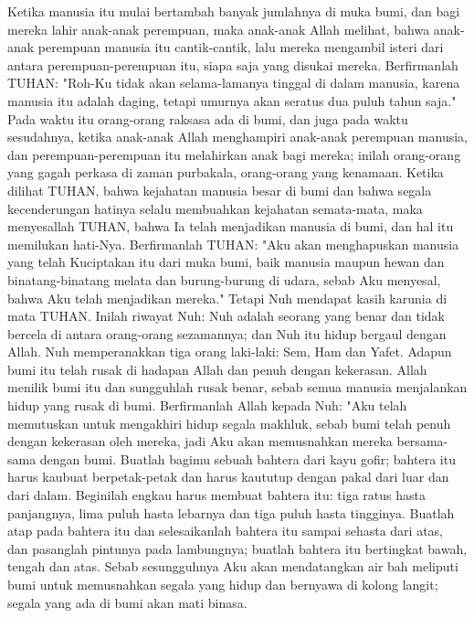 \begin{biblechapter} %
 Ketika manusia itu mulai bertambah banyak jumlahnya di muka bumi, dan bagi mereka lahir anak-anak perempuan,
\verse maka anak-anak Allah melihat, bahwa anak-anak perempuan manusia itu cantik-cantik, lalu mereka mengambil isteri dari antara perempuan-perempuan itu, siapa saja yang disukai mereka.
\verse Berfirmanlah TUHAN: "Roh-Ku tidak akan selama-lamanya tinggal di dalam manusia, karena manusia itu adalah daging, tetapi umurnya akan seratus dua puluh tahun saja."
\verse Pada waktu itu orang-orang raksasa ada di bumi, dan juga pada waktu sesudahnya, ketika anak-anak Allah menghampiri anak-anak perempuan manusia, dan perempuan-perempuan itu melahirkan anak bagi mereka; inilah orang-orang yang gagah perkasa di zaman purbakala, orang-orang yang kenamaan.
\verse Ketika dilihat TUHAN, bahwa kejahatan manusia besar di bumi dan bahwa segala kecenderungan hatinya selalu membuahkan kejahatan semata-mata,
\verse maka menyesallah TUHAN, bahwa Ia telah menjadikan manusia di bumi, dan hal itu memilukan hati-Nya.
\verse Berfirmanlah TUHAN: "Aku akan menghapuskan manusia yang telah Kuciptakan itu dari muka bumi, baik manusia maupun hewan dan binatang-binatang melata dan burung-burung di udara, sebab Aku menyesal, bahwa Aku telah menjadikan mereka."
\verse Tetapi Nuh mendapat kasih karunia di mata TUHAN.
 Inilah riwayat Nuh: Nuh adalah seorang yang benar dan tidak bercela di antara orang-orang sezamannya; dan Nuh itu hidup bergaul dengan Allah.
\verse Nuh memperanakkan tiga orang laki-laki: Sem, Ham dan Yafet.
\verse Adapun bumi itu telah rusak di hadapan Allah dan penuh dengan kekerasan.
\verse Allah menilik bumi itu dan sungguhlah rusak benar, sebab semua manusia menjalankan hidup yang rusak di bumi.
\verse Berfirmanlah Allah kepada Nuh: "Aku telah memutuskan untuk mengakhiri hidup segala makhluk, sebab bumi telah penuh dengan kekerasan oleh mereka, jadi Aku akan memusnahkan mereka bersama-sama dengan bumi.
\verse Buatlah bagimu sebuah bahtera dari kayu gofir; bahtera itu harus kaubuat berpetak-petak dan harus kaututup dengan pakal dari luar dan dari dalam.
\verse Beginilah engkau harus membuat bahtera itu: tiga ratus hasta panjangnya, lima puluh hasta lebarnya dan tiga puluh hasta tingginya.
\verse Buatlah atap pada bahtera itu dan selesaikanlah bahtera itu sampai sehasta dari atas, dan pasanglah pintunya pada lambungnya; buatlah bahtera itu bertingkat bawah, tengah dan atas.
\verse Sebab sesungguhnya Aku akan mendatangkan air bah meliputi bumi untuk memusnahkan segala yang hidup dan bernyawa di kolong langit; segala yang ada di bumi akan mati binasa.

\end{biblechapter}
